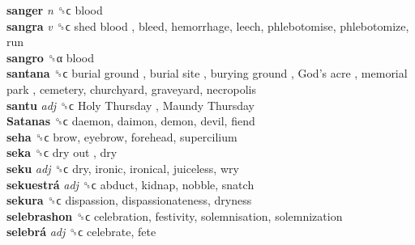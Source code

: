 \textbf{sanger} \emph{n}  ␝ϲ  blood  \\
\textbf{sangra} \emph{v}  ␝ϲ   shed blood , bleed, hemorrhage, leech, phlebotomise, phlebotomize, run  \\
\textbf{sangro} ␝α  blood  \\
\textbf{santana} ␝ϲ   burial ground ,  burial site ,  burying ground ,  God’s acre ,  memorial park , cemetery, churchyard, graveyard, necropolis  \\
\textbf{santu} \emph{adj}  ␝ϲ   Holy Thursday ,  Maundy Thursday   \\
\textbf{Satanas} ␝ϲ  daemon, daimon, demon, devil, fiend  \\
\textbf{seha} ␝ϲ  brow, eyebrow, forehead, supercilium  \\
\textbf{seka} ␝ϲ   dry out , dry  \\
\textbf{seku} \emph{adj}  ␝ϲ  dry, ironic, ironical, juiceless, wry  \\
\textbf{sekuestrá} \emph{adj}  ␝ϲ  abduct, kidnap, nobble, snatch  \\
\textbf{sekura} ␝ϲ  dispassion, dispassionateness, dryness  \\
\textbf{selebrashon} ␝ϲ  celebration, festivity, solemnisation, solemnization  \\
\textbf{selebrá} \emph{adj}  ␝ϲ  celebrate, fete  \\
